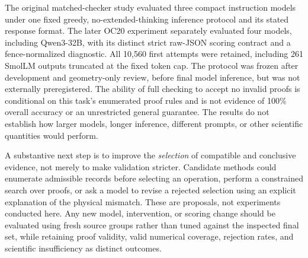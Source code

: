 The original matched-checker study evaluated three compact instruction models under one fixed greedy, no-extended-thinking inference protocol and its stated response format. The later OC20 experiment separately evaluated four models, including Qwen3-32B, with its distinct strict raw-JSON scoring contract and a fence-normalized diagnostic. All 10,560 first attempts were retained, including 261 SmolLM outputs truncated at the fixed token cap. The protocol was frozen after development and geometry-only review, before final model inference, but was not externally preregistered. The ability of full checking to accept no invalid proofs is conditional on this task's enumerated proof rules and is not evidence of 100\% overall accuracy or an unrestricted general guarantee. The results do not establish how larger models, longer inference, different prompts, or other scientific quantities would perform.

A substantive next step is to improve the \emph{selection} of compatible and conclusive evidence, not merely to make validation stricter. Candidate methods could enumerate admissible records before selecting an operation, perform a constrained search over proofs, or ask a model to revise a rejected selection using an explicit explanation of the physical mismatch. These are proposals, not experiments conducted here. Any new model, intervention, or scoring change should be evaluated using fresh source groups rather than tuned against the inspected final set, while retaining proof validity, valid numerical coverage, rejection rates, and scientific insufficiency as distinct outcomes.
